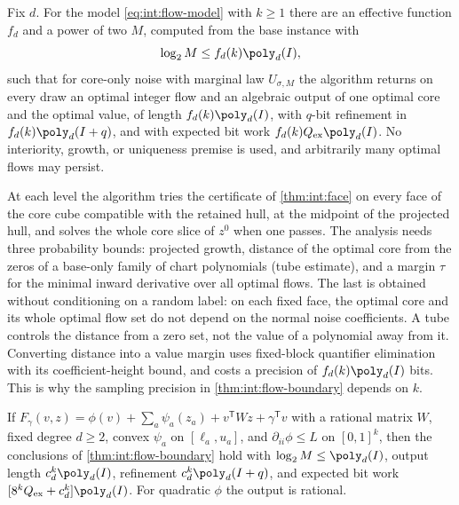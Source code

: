 \begin{theorem}\label{thm:int:flow-boundary}
Fix $d$. For the model \eqref{eq:int:flow-model} with $k\ge1$ there are an
effective function $f_d$ and a power of two $M$, computed from the base
instance with
\[
 \log_2M\le f_d(k)\poly_d(I),
\]
such that for core-only noise with marginal law $U_{\sigma,M}$ the algorithm
returns on every draw an optimal integer flow and an algebraic output of one
optimal core and the optimal value, of length $f_d(k)\poly_d(I)$, with
$q$-bit refinement in $f_d(k)\poly_d(I+q)$, and with expected bit work
$f_d(k)Q_{\rm ex}\poly_d(I)$. No interiority, growth, or uniqueness premise is
used, and arbitrarily many optimal flows may persist.
\end{theorem}

At each level the algorithm tries the certificate of \cref{thm:int:face} on
every face of the core cube compatible with the retained hull, at the midpoint
of the projected hull, and solves the whole core slice of $z^0$ when one passes.
The analysis needs three probability bounds: projected growth, distance of the
optimal core from the zeros of a base-only family of chart polynomials (tube
estimate), and a margin $\tau$ for the minimal inward derivative over all
optimal flows. The last is obtained without conditioning on a random label: on
each fixed face, the optimal core and its whole optimal flow set do not depend
on the normal noise coefficients. A tube controls the distance from a zero set,
not the value of a polynomial away from it. Converting distance into a value
margin uses fixed-block quantifier elimination with its coefficient-height
bound, and costs a precision of $f_d(k)\poly_d(I)$ bits. This is why the
sampling precision in \cref{thm:int:flow-boundary} depends on $k$.

\begin{corollary}\label{cor:int:bilinear}
If $F_\gamma(v,z)=\phi(v)+\sum_a\psi_a(z_a)+v^{\mathsf T}Wz+\gamma^{\mathsf T}v$
with a rational matrix $W$, fixed degree $d\ge2$, convex $\psi_a$ on
$[\ell_a,u_a]$, and $\partial_{ii}\phi\le L$ on $[0,1]^k$, then the conclusions
of \cref{thm:int:flow-boundary} hold with $\log_2M\le\poly_d(I)$, output length
$c_d^k\poly_d(I)$, refinement $c_d^k\poly_d(I+q)$, and expected bit work
$[8^kQ_{\rm ex}+c_d^k]\poly_d(I)$. For quadratic $\phi$ the output is rational.
\end{corollary}

